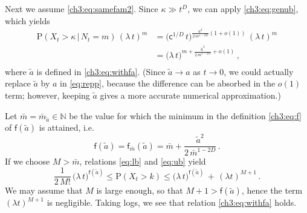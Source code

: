 \documentclass[a4paper,reqno,11pt]{amsart}
\numberwithin{equation}{section}
\renewcommand{\tilde}{\widetilde}          %
\newcommand{\N}{\mathbb{N}}
\newcommand{\PEfont}{\mathrm}
\renewcommand{\P}{\ensuremath{\PEfont P}}
\newcommand\sfc{\mathsf{c}}
\newcommand\sff{\mathsf{f}}
\begin{document}
\smallskip

Next we assume \eqref{ch3:eq:samefam2}. Since $\kappa \gg t^D$, we can apply 
\eqref{ch3:eq:genub}, which yields
\begin{equation} \label{eq:repp}
\begin{split}
	\P(X_t >\kappa \,|\, N_t=m) \, (\lambda \, t)^m & =
	\big( \sfc^{1/D} \, t \big)^{\frac{a^2}{2 \, m^{1-2D}} (1+o(1))} \, (\lambda \, t)^m \\
	& = \big( \lambda \, t \big)^{m + \frac{\tilde a^2}{2 \, m^{1-2D}} + o(1)} \,, \\ 
\end{split}
\end{equation}
where $\tilde a$ is defined in \eqref{ch3:eq:withfa}.
(Since $\tilde a \to a$ as $t\to 0$, we could actually replace $\tilde a$ by $a$ in \eqref{eq:repp},
because the difference can be absorbed in the $o(1)$ term; however, keeping $\tilde a$
gives a more accurate numerical approximation.)

Let $\bar m = \bar m_{\tilde a} \in \N$ be the value for which
the minimum in the definition \eqref{ch3:eq:f} of $\sff(\tilde a)$ is attained, i.e.\
\begin{equation} \label{ch3:eq:fmax}
	\sff(\tilde a) = \sff_{\bar m}(\tilde a) =
	\bar m + \frac{\tilde a^2}{2 \, \bar m^{1-2D}} \,.
\end{equation}
If we choose $M > \bar m$, relations \eqref{eq:lb} and \eqref{eq:ub} yield
\begin{equation*}
	\frac{1}{2 \, M!} \, \big( \lambda \, t \big)^{\sff(\tilde a)}
	\le \P(X_t > k) \le \big( \lambda \, t \big)^{\sff(\tilde a)} \,+\, (\lambda t)^{M+1} \,.
\end{equation*}
We may assume that $M$ is large enough, so that $M+1 > \sff(\tilde a)$,
hence the term $(\lambda t)^{M+1}$
is negligible. Taking logs, we see that relation \eqref{ch3:eq:withfa} holds.
\end{document}
